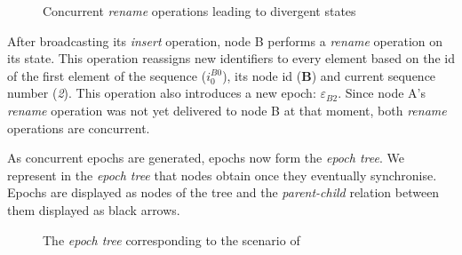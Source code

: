 \documentclass[10pt,journal,compsoc]{IEEEtran}
\let\MYoriglatexcaption\caption
\renewcommand{\caption}[2][\relax]{\MYoriglatexcaption[#2]{#2}}
\newcommand{\trm}[1]{\mathit{#1}}
\newcommand{\id}[3]{$\trm{#1}^{\trm{#2}}_{\trm{#3}}$}
\newcommand{\epoch}[1]{$\varepsilon_{#1}$}
\begin{document}
\begin{figure}[!ht]
    \caption{Concurrent \emph{rename} operations leading to divergent states}
    \label{fig:conflicting-rename-operations}
\end{figure}

After broadcasting its \emph{insert} operation, node B performs a \emph{rename} operation on its state.
This operation reassigns new identifiers to every element based on the id of the first element of the sequence (\id{i}{B0}{0}), its node id (\textbf{B}) and current sequence number (\emph{2}).
This operation also introduces a new epoch: \epoch{B2}.
Since node A's \emph{rename} operation was not yet delivered to node B at that moment, both \emph{rename} operations are concurrent.

As concurrent epochs are generated, epochs now form the \emph{epoch tree}.
We represent in  the \emph{epoch tree} that nodes obtain once they eventually synchronise.
Epochs are displayed as nodes of the tree and the \emph{parent-child} relation between them displayed as black arrows.

\begin{figure}[!ht]
    \centering
    \caption{The \emph{epoch tree} corresponding to the scenario of \Cref{fig:conflicting-rename-operations}}
    \label{fig:epoch-tree}
\end{figure}
\end{document}
